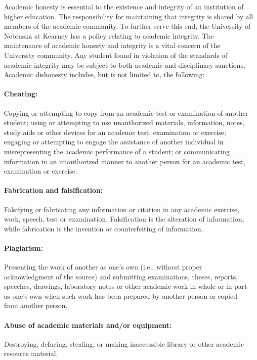 \documentclass[12pt,fullpage]{article}
\newcounter{ex}\setcounter{ex}{0}
\begin{document}
Academic honesty is essential to the existence and integrity of an institution of higher education. The
responsibility for maintaining that integrity is shared by all members of the academic community. To
further serve this end, the University of Nebraska at Kearney has a policy relating to academic integrity.
The maintenance of academic honesty and integrity is a vital concern of the University community. Any
student found in violation of the standards of academic integrity may be subject to both academic and
disciplinary sanctions. Academic dishonesty includes, but is not limited to, the following:

\paragraph{Cheating:} Copying or attempting to copy from an academic test or examination of another student; using
or attempting to use unauthorized materials, information, notes, study aids or other devices for an academic
test, examination or exercise; engaging or attempting to engage the assistance of another individual in
misrepresenting the academic performance of a student; or communicating information in an unauthorized
manner to another person for an academic test, examination or exercise.

\paragraph{Fabrication and falsification:} Falsifying or fabricating any information or citation in any academic exercise,
work, speech, test or examination. Falsification is the alteration of information, while fabrication is the
invention or counterfeiting of information.

\paragraph{Plagiarism:} Presenting the work of another as one's own (i.e., without proper acknowledgment of the source)
and submitting examinations, theses, reports, speeches, drawings, laboratory notes or other academic work
in whole or in part as one's own when such work has been prepared by another person or copied from another
person.

\paragraph{Abuse of academic materials and/or equipment:} Destroying, defacing, stealing, or making inaccessible library
or other academic resource material.
\end{document}
